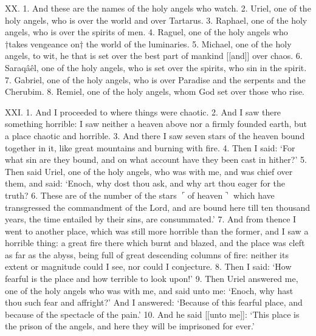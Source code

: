 
XX. 1. And these are the names of the holy angels
who watch. 2. Uriel, one of the holy angels, who is
over the world and over Tartarus. 3. Raphael, one
of the holy angels, who is over the spirits of men.
4. Raguel, one of the holy angels who †takes vengeance
on† the world of the luminaries. 5. Michael,
one of the holy angels, to wit, he that is set over the
best part of mankind [[and]] over chaos. 6. Saraqâêl,
one of the holy angels, who is set over the spirits, who
sin in the spirit. 7. Gabriel, one of the holy angels,
who is over Paradise and the serpents and the Cherubim.
8. Remiel, one of the holy angels, whom God
set over those who rise.



XXI. 1. And I proceeded to where things were
chaotic. 2. And I saw there something horrible:
I saw neither a heaven above nor a firmly founded
earth, but a place chaotic and horrible. 3. And there
I saw seven stars of the heaven bound together in it,
like great mountains and burning with fire. 4. Then
I said: ‘For what sin are they bound, and on what
account have they been cast in hither?’ 5. Then
said Uriel, one of the holy angels, who was with me,
and was chief over them, and said: ‘Enoch, why dost
thou ask, and why art thou eager for the truth?
6. These are of the number of the stars $\ulcorner$of heaven$\urcorner$
which have transgressed the commandment of the
Lord, and are bound here till ten thousand years,
the time entailed by their sins, are consummated.’
7. And from thence I went to another place, which
was still more horrible than the former, and I saw a
horrible thing: a great fire there which burnt and
blazed, and the place was cleft as far as the abyss,
being full of great descending columns of fire: neither
its extent or magnitude could I see, nor could I conjecture.
8. Then I said: ‘How fearful is the place
and how terrible to look upon!’ 9. Then Uriel
answered me, one of the holy angels who was with me,
and said unto me: ‘Enoch, why hast thou such fear
and affright?’ And I answered: ‘Because of this
fearful place, and because of the spectacle of the
pain.’ 10. And he said [[unto me]]: ‘This place is
the prison of the angels, and here they will be imprisoned
for ever.’


